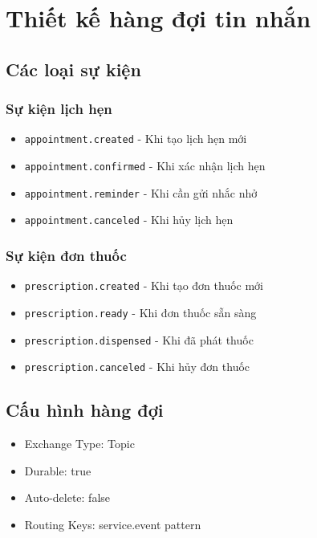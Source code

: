 \documentclass[12pt,a4paper]{report}
\begin{document}
    \section{Thiết kế hàng đợi tin nhắn}

    \subsection{Các loại sự kiện}
    \subsubsection{Sự kiện lịch hẹn}
    \begin{itemize}
        \item \texttt{appointment.created} - Khi tạo lịch hẹn mới
        \item \texttt{appointment.confirmed} - Khi xác nhận lịch hẹn
        \item \texttt{appointment.reminder} - Khi cần gửi nhắc nhở
        \item \texttt{appointment.canceled} - Khi hủy lịch hẹn
    \end{itemize}

    \subsubsection{Sự kiện đơn thuốc}
    \begin{itemize}
        \item \texttt{prescription.created} - Khi tạo đơn thuốc mới
        \item \texttt{prescription.ready} - Khi đơn thuốc sẵn sàng
        \item \texttt{prescription.dispensed} - Khi đã phát thuốc
        \item \texttt{prescription.canceled} - Khi hủy đơn thuốc
    \end{itemize}

    \subsection{Cấu hình hàng đợi}
    \begin{itemize}
        \item Exchange Type: Topic
        \item Durable: true
        \item Auto-delete: false
        \item Routing Keys: service.event pattern
    \end{itemize}
\end{document}
